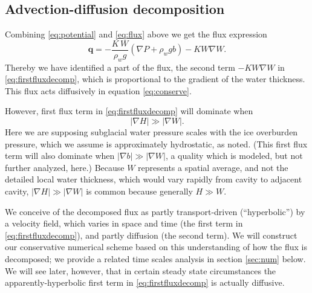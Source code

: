 \documentclass[11pt,final]{amsart}%
\newcommand\bq{\mathbf{q}}
\newcommand{\grad}{\nabla}
\begin{document}

\subsection*{Advection-diffusion decomposition}  Combining \eqref{eq:potential} and \eqref{eq:flux} above we get the flux expression
\begin{equation}
  \bq = - \frac{K\, W}{\rho_w g} \left(\grad P + \rho_w g b\right) - K W \grad W. \label{eq:firstfluxdecomp}
\end{equation}
Thereby we have identified a part of the flux, the second term $-K W \grad W$ in \eqref{eq:firstfluxdecomp}, which is proportional to the gradient of the water thickness.  This flux acts diffusively in equation \eqref{eq:conserve}.

However, first flux term in \eqref{eq:firstfluxdecomp} will dominate when
    $$|\grad H| \gg |\grad W|.$$
Here we are supposing subglacial water pressure scales with the ice overburden pressure, which we assume is approximately hydrostatic, as noted.  (This first flux term will also dominate when $|\grad b| \gg |\grad W|$, a quality which is modeled, but not further analyzed, here.)  Because $W$ represents a spatial average, and not the detailed local water thickness, which would vary rapidly from cavity to adjacent cavity, $|\grad H| \gg |\grad W|$ is common because generally $H\gg W$.

We conceive of the decomposed flux as partly transport-driven (``hyperbolic'') by a velocity field, which varies in space and time (the first term in \eqref{eq:firstfluxdecomp}), and partly diffusion (the second term).  We will construct our conservative numerical scheme based on this understanding of how the flux is decomposed; we provide a related time scales analysis in section \ref{sec:num} below.  We will see later, however, that in certain steady state circumstances the apparently-hyperbolic first term in \eqref{eq:firstfluxdecomp} is actually diffusive.
\end{document}
